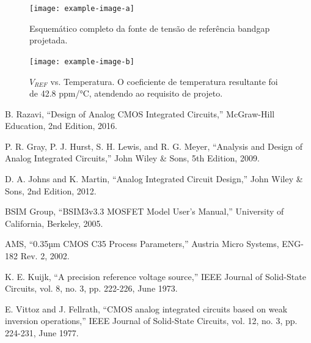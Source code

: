 ﻿\documentclass[12pt,a4paper]{article}
\begin{document}
\begin{figure}[H]
\centering
\texttt{[image: example-image-a]}
\caption{Esquemático completo da fonte de tensão de referência bandgap projetada.}
\label{fig:bandgap_complete_schematic}
\end{figure}

\begin{figure}[H]
\centering
\texttt{[image: example-image-b]}
\caption{$V_{REF}$ vs. Temperatura. O coeficiente de temperatura resultante foi de 42.8 ppm/°C, atendendo ao requisito de projeto.}
\label{fig:vref_vs_temp}
\end{figure}


{}
\begin{thebibliography}{99}
     B. Razavi, ``Design of Analog CMOS Integrated Circuits,'' McGraw-Hill Education, 2nd Edition, 2016.
    
     P. R. Gray, P. J. Hurst, S. H. Lewis, and R. G. Meyer, ``Analysis and Design of Analog Integrated Circuits,'' John Wiley \& Sons, 5th Edition, 2009.
    
     D. A. Johns and K. Martin, ``Analog Integrated Circuit Design,'' John Wiley \& Sons, 2nd Edition, 2012.
    
     BSIM Group, ``BSIM3v3.3 MOSFET Model User's Manual,'' University of California, Berkeley, 2005.
    
     AMS, ``0.35µm CMOS C35 Process Parameters,'' Austria Micro Systems, ENG-182 Rev. 2, 2002.
    
     K. E. Kuijk, ``A precision reference voltage source,'' IEEE Journal of Solid-State Circuits, vol. 8, no. 3, pp. 222-226, June 1973.
    
     E. Vittoz and J. Fellrath, ``CMOS analog integrated circuits based on weak inversion operations,'' IEEE Journal of Solid-State Circuits, vol. 12, no. 3, pp. 224-231, June 1977.
\end{thebibliography}
\end{document}
